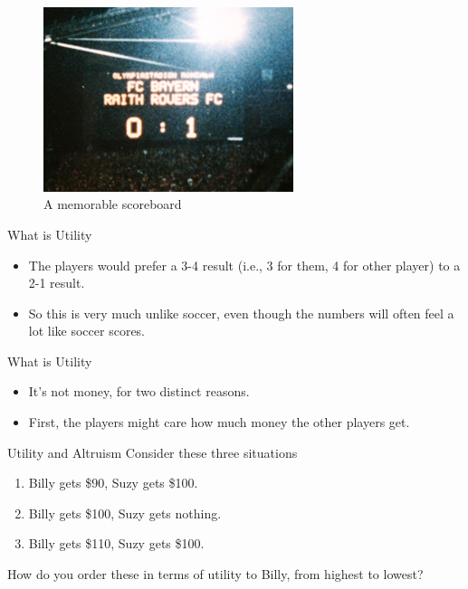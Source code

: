 \documentclass[
  14pt,
  letterpaper,
  ignorenonframetext,
  aspectratio=169,
  handout]{beamer}
\providecommand{\tightlist}{%
  \setlength{\itemsep}{0pt}\setlength{\parskip}{0pt}}\usepackage{longtable,booktabs,array}
\let\olditem\item
\renewcommand{\item}{%
\olditem\vspace{6pt}}
\begin{document}
\begin{frame}
\begin{figure}

{\centering \includegraphics[width=0.65\textwidth,height=0.65\textheight]{images/raith.jpg}

}

\caption{A memorable scoreboard}

\end{figure}
\end{frame}

\begin{frame}{What is Utility}
\protect\hypertarget{what-is-utility-1}{}
\begin{itemize}[<+->]
\tightlist
\item
  The players would prefer a 3-4 result (i.e., 3 for them, 4 for other
  player) to a 2-1 result.
\item
  So this is very much unlike soccer, even though the numbers will often
  feel a lot like soccer scores.
\end{itemize}
\end{frame}

\begin{frame}{What is Utility}
\protect\hypertarget{what-is-utility-2}{}
\begin{itemize}[<+->]
\tightlist
\item
  It's not money, for two distinct reasons.
\item
  First, the players might care how much money the other players get.
\end{itemize}
\end{frame}

\begin{frame}{Utility and Altruism}
\protect\hypertarget{utility-and-altruism}{}
Consider these three situations

\begin{enumerate}
\tightlist
\item
  Billy gets \$90, Suzy gets \$100.
\item
  Billy gets \$100, Suzy gets nothing.
\item
  Billy gets \$110, Suzy gets \$100.
\end{enumerate}

How do you order these in terms of utility to Billy, from highest to
lowest?
\end{frame}
\end{document}
